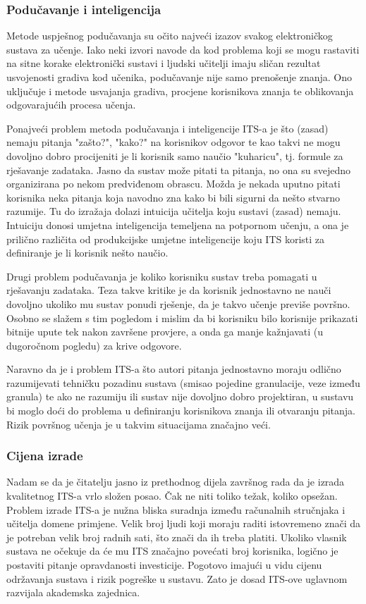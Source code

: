 \documentclass[times, utf8, zavrsni]{fer}
\begin{document}
\subsubsection{Podučavanje i inteligencija}
Metode uspješnog podučavanja su očito najveći izazov svakog elektroničkog sustava za učenje. Iako neki izvori navode da kod problema koji se mogu rastaviti na sitne korake elektronički sustavi i ljudski učitelji imaju sličan rezultat usvojenosti gradiva kod učenika, podučavanje nije samo prenošenje znanja. Ono uključuje i metode usvajanja gradiva, procjene korisnikova znanja te oblikovanja odgovarajućih procesa učenja.
\par
Ponajveći problem metoda podučavanja i inteligencije ITS-a je što (zasad) nemaju pitanja "zašto?", "kako?" na korisnikov odgovor te kao takvi ne mogu dovoljno dobro procijeniti je li korisnik samo naučio "kuharicu", tj. formule za rješavanje zadataka. Jasno da sustav može pitati ta pitanja, no ona su svejedno organizirana po nekom predviđenom obrascu. Možda je nekada uputno pitati korisnika neka pitanja koja navodno zna kako bi bili sigurni da nešto stvarno razumije. Tu do izražaja dolazi intuicija učitelja koju sustavi (zasad) nemaju. Intuiciju donosi umjetna inteligencija temeljena na potpornom učenju, a ona je prilično različita od produkcijske umjetne inteligencije koju ITS koristi za definiranje je li korisnik nešto naučio.
\par
Drugi problem podučavanja je koliko korisniku sustav treba pomagati u rješavanju zadataka. Teza takve kritike je da korisnik jednostavno ne nauči dovoljno ukoliko mu sustav ponudi rješenje, da je takvo učenje previše površno. Osobno se slažem s tim pogledom i mislim da bi korisniku bilo korisnije prikazati bitnije upute tek nakon završene provjere, a onda ga manje kažnjavati (u dugoročnom pogledu) za krive odgovore.
\par
Naravno da je i problem ITS-a što autori pitanja jednostavno moraju odlično razumijevati tehničku pozadinu sustava (smisao pojedine granulacije, veze između granula) te ako ne razumiju ili sustav nije dovoljno dobro projektiran, u sustavu bi moglo doći do problema u definiranju korisnikova znanja ili otvaranju pitanja. Rizik površnog učenja je u takvim situacijama značajno veći.

\subsubsection{Cijena izrade}
Nadam se da je čitatelju jasno iz prethodnog dijela završnog rada da je izrada kvalitetnog ITS-a vrlo složen posao. Čak ne niti toliko težak, koliko opsežan. Problem izrade ITS-a je nužna bliska suradnja između računalnih stručnjaka i učitelja domene primjene. Velik broj ljudi koji moraju raditi istovremeno znači da je potreban velik broj radnih sati, što znači da ih treba platiti. Ukoliko vlasnik sustava ne očekuje da će mu ITS značajno povećati broj korisnika, logično je postaviti pitanje opravdanosti investicije. Pogotovo imajući u vidu cijenu održavanja sustava i rizik pogreške u sustavu. Zato je dosad ITS-ove uglavnom razvijala akademska zajednica.
\end{document}
